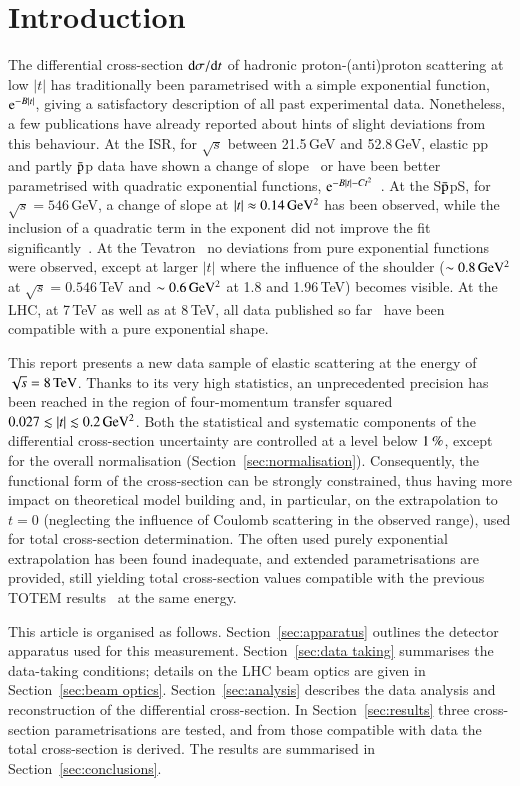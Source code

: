 \section{Introduction}
%
The differential cross-section ${\rm d} \sigma/{\rm d} t$ of hadronic proton-(anti)proton 
scattering at low $|t|$ has traditionally been parametrised with a simple 
exponential function, ${\rm e}^{-B |t|}$, giving a satisfactory description of 
all past experimental data.
Nonetheless, a few publications have already reported about hints of
slight deviations from this behaviour. At the ISR, for $\sqrt{s}$ 
between 21.5\,GeV and 52.8\,GeV, elastic pp and partly $\rm\bar{p}$p data have shown a 
change of slope~\cite{plb39,plb115} or have been better parametrised with quadratic 
exponential functions, ${\rm e}^{-B |t|-C t^2}$~\cite{npb141,npb248}. 
At the S$\rm\bar{p}$pS, for 
$\sqrt{s} = 546\,$GeV, a change of slope at $|t| \approx 0.14\,\rm GeV^{2}$ 
has been observed, while the inclusion of a quadratic term in the exponent did
not improve the fit significantly~\cite{plb147}. At the Tevatron~\cite{prl61,prl68,prd50,prd86} no 
deviations from pure exponential functions were observed, except at larger $|t|$ where
the influence of the shoulder ($\sim 0.8\,\rm GeV^{2}$ at 
$\sqrt{s} = 0.546$\,TeV and $\sim 0.6\,\rm GeV^{2}$ at 1.8 and 1.96\,TeV) 
becomes visible.
At the LHC, at 7\,TeV as well as at 8\,TeV, all data published so 
far~\cite{epl96,epl101-el,prl111,alfa} have been
compatible with a pure exponential shape.

This report presents a new data sample of elastic scattering at the energy of $\sqrt s = 8\,{\rm TeV}$. Thanks to its very high statistics,
an unprecedented precision has been reached in the region of four-momentum transfer squared $0.027 \lesssim |t| \lesssim 0.2\,{\rm GeV^2}$. Both the statistical and systematic components of the differential cross-section uncertainty are controlled 
at a level below $1\,{\rm \%}$, except for the overall normalisation 
(Section~\ref{sec:normalisation}). Consequently, the functional form of the cross-section can be strongly constrained, thus having more impact on theoretical model building and, in particular, on the extrapolation to $t=0$ (neglecting the influence of Coulomb scattering in the observed range), used for total cross-section determination. The often used purely exponential extrapolation has been found inadequate, and extended parametrisations are provided, still yielding total cross-section values compatible with the previous TOTEM results~\cite{prl111} at the same energy.

This article is organised as follows. Section~\ref{sec:apparatus} outlines the detector apparatus used for this measurement. Section~\ref{sec:data taking} summarises the data-taking conditions; details on the LHC beam optics are given in Section~\ref{sec:beam optics}. Section~\ref{sec:analysis} describes the data analysis and reconstruction of the differential cross-section. In Section~\ref{sec:results} three cross-section parametrisations are tested, and from those compatible with data the total cross-section is derived. The results are summarised in Section~\ref{sec:conclusions}.

